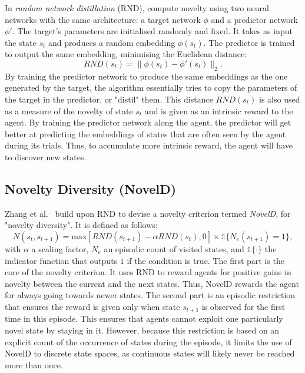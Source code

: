 In \textit{random network distillation} (RND), \cite{Burda2019_RND} compute novelty using two neural networks with the same architecture: a target network $\phi$ and a predictor network $\phi'$. The target's parameters are initialised randomly and fixed. It takes as input the state $s_t$ and produces a random embedding $\phi(s_t)$. The predictor is trained to output the same embedding, minimising the Euclidean distance:
\begin{equation}\label{eq:JIM:RND}
    RND(s_t)=\lVert\phi(s_t)-\phi'(s_t)\rVert_2.
\end{equation}
By training the predictor network to produce the same embeddings as the one generated by the target, the algorithm essentially tries to copy the parameters of the target in the predictor, or "distil" them. This distance $RND(s_t)$ is also used as a measure of the novelty of state $s_t$ and is given as an intrinsic reward to the agent. By training the predictor network along the agent, the predictor will get better at predicting the embeddings of states that are often seen by the agent during its trials. Thus, to accumulate more intrinsic reward, the agent will have to discover new states. 




\subsection{Novelty Diversity (NovelD)} \label{sec:JIM:NovelD}

Zhang et al.~\citep{Zhang2021_NovelD} build upon RND to devise a novelty criterion termed \textit{NovelD}, for "novelty diversity". It is defined as follows:
\begin{equation}\label{eq:JIM:NovelD}
    N(s_t, s_{t+1}) = \mathrm{max}[RND(s_{t+1}) - \alpha RND(s_t), 0]\times\mathds{1}\{N_e(s_{t+1})=1\},
\end{equation}
with $\alpha$ a scaling factor, $N_e$ an episodic count of visited states, and $\mathds{1}\{\cdot\}$ the indicator function that outputs $1$ if the condition is true. The first part is the core of the novelty criterion. It uses RND to reward agents for positive gains in novelty between the current and the next states. Thus, NovelD rewards the agent for always going towards newer states. The second part is an episodic restriction that ensures the reward is given only when state $s_{t+1}$ is observed for the first time in this episode. This ensures that agents cannot exploit one particularly novel state by staying in it. However, because this restriction is based on an explicit count of the occurrence of states during the episode, it limits the use of NovelD to discrete state spaces, as continuous states will likely never be reached more than once. 



